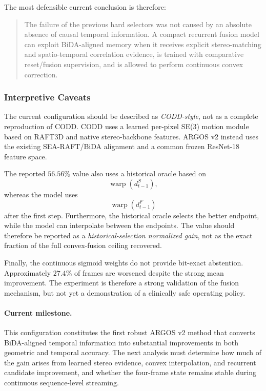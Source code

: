 \documentclass[11pt,a4paper]{article}
\begin{document}
The most defensible current conclusion is therefore:
\begin{quote}
The failure of the previous hard selectors was not caused by an absolute absence of causal
temporal information. A compact recurrent fusion model can exploit BiDA-aligned memory when
it receives explicit stereo-matching and spatio-temporal correlation evidence, is trained
with comparative reset/fusion supervision, and is allowed to perform continuous convex
correction.
\end{quote}

\subsubsection{Interpretive Caveats}

The current configuration should be described as \emph{CODD-style}, not as a complete
reproduction of CODD. CODD uses a learned per-pixel SE(3) motion module based on RAFT3D
and native stereo-backbone features. ARGOS v2 instead uses the existing SEA-RAFT/BiDA
alignment and a common frozen ResNet-18 feature space.

The reported \(56.56\%\) value also uses a historical oracle based on
\begin{equation}
    \operatorname{warp}\!\left(d_{t-1}^{S}\right),
\end{equation}
whereas the model uses
\begin{equation}
    \operatorname{warp}\!\left(d_{t-1}^{F}\right)
\end{equation}
after the first step. Furthermore, the historical oracle selects the better endpoint,
while the model can interpolate between the endpoints. The value should therefore be
reported as a
\emph{historical-selection normalized gain}, not as the exact fraction of the full
convex-fusion ceiling recovered.

Finally, the continuous sigmoid weights do not provide bit-exact abstention. Approximately
\(27.4\%\) of frames are worsened despite the strong mean improvement. The experiment is
therefore a strong validation of the fusion mechanism, but not yet a demonstration of a
clinically safe operating policy.

\paragraph{Current milestone.}

This configuration constitutes the first robust ARGOS v2 method that converts
BiDA-aligned temporal information into substantial improvements in both geometric and
temporal accuracy. The next analysis must determine how much of the gain arises from
learned stereo evidence, convex interpolation, and recurrent candidate improvement, and
whether the four-frame state remains stable during continuous sequence-level streaming.
\end{document}
